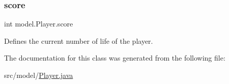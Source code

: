 \subsubsection{\texorpdfstring{score}{score}}
{\footnotesize\ttfamily int model.\+Player.\+score\hspace{0.3cm}{\ttfamily [private]}}

Defines the current number of life of the player. 

The documentation for this class was generated from the following file\+:\begin{DoxyCompactItemize}
\item 
src/model/\hyperlink{_player_8java}{Player.\+java}\end{DoxyCompactItemize}

